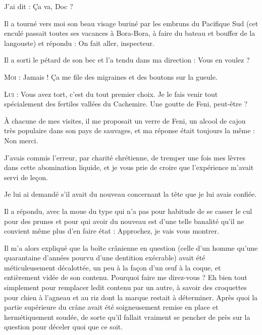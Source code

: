 \begin{dialogue}

%
%


J’ai dit : Ça va, Doc ?

Il a tourné vers moi son beau visage buriné par les embruns du Pacifique Sud (cet enculé passait toutes ses vacances à Bora-Bora, à faire du bateau et bouffer de la langouste) et répondu : On fait aller, inspecteur.

Il a sorti le pétard de son bec et l’a tendu dans ma direction : Vous en voulez ?

\textsc{Moi} : Jamais ! Ça me file des migraines et des boutons sur la gueule.

\textsc{Lui} : Vous avez tort, c’est du tout premier choix. Je le fais venir tout spécialement des fertiles vallées du Cachemire. Une goutte de Feni, peut-être ?

\end{dialogue}

À chacune de mes visites, il me proposait un verre de Feni, un alcool de cajou très populaire dans son pays de sauvages, et ma réponse était toujours la même : Non merci.

J’avais commis l’erreur, par charité chrétienne, de tremper une fois mes lèvres dans cette abomination liquide, et je vous prie de croire que l’expérience m’avait servi de leçon.

Je lui ai demandé s’il avait du nouveau concernant la tête que je lui avais confiée.

Il a répondu, avec la moue du type qui n’a pas pour habitude de se casser le cul pour des prunes et pour qui avoir du nouveau est d’une telle banalité qu’il ne convient même plus d’en faire état : Approchez, je vais vous montrer.

Il m’a alors expliqué que la boîte crânienne en question (celle d’un homme qu’une quarantaine d’années pourvu d’une dentition exécrable) avait été méticuleusement décalottée, un peu à la façon d’un œuf à la coque, et entièrement vidée de son contenu. Pourquoi faire me direz-vous ? Eh bien tout simplement pour remplacer ledit contenu par un autre, à savoir des croquettes pour chien à l’agneau et au riz dont la marque restait à déterminer. Après quoi la partie supérieure du crâne avait été soigneusement remise en place et hermétiquement soudée, de sorte qu’il fallait vraiment se pencher de près sur la question pour déceler quoi que ce soit. 

